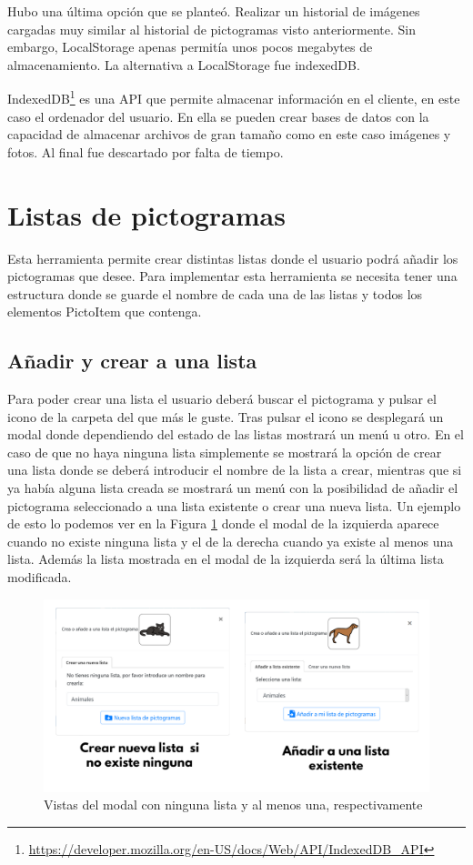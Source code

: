 Hubo una última opción que se planteó. Realizar un historial de imágenes cargadas muy similar al historial de pictogramas visto anteriormente. Sin embargo, LocalStorage apenas permitía unos pocos megabytes de almacenamiento. La alternativa a LocalStorage fue indexedDB. 

IndexedDB\footnote{\url{https://developer.mozilla.org/en-US/docs/Web/API/IndexedDB_API}}   es una API que permite almacenar información en el cliente, en este caso el ordenador del usuario. En ella se pueden crear bases de datos con la capacidad de almacenar archivos de gran tamaño como en este caso imágenes y fotos. Al final fue descartado por falta de tiempo.





\section{Listas de pictogramas}
\label{listapictos}

Esta herramienta permite crear distintas listas donde el usuario podrá añadir los pictogramas que desee.
Para implementar esta herramienta se necesita tener una estructura donde se guarde el nombre de cada una de las listas y todos los elementos PictoItem que contenga. 

\subsection{Añadir y crear a una lista}

Para poder crear una lista el usuario deberá buscar el pictograma y pulsar el icono de la carpeta del que más le guste. Tras pulsar el icono se desplegará un modal donde dependiendo del estado de las listas mostrará un menú u otro. En el caso de que no haya ninguna lista simplemente se mostrará la opción de crear una lista donde se deberá introducir el nombre de la lista a crear, mientras que si ya había alguna lista creada se mostrará un menú con la posibilidad de añadir el pictograma seleccionado a una lista existente o crear una nueva lista. Un ejemplo de esto lo podemos ver en la Figura \ref{fig:modalescoleccion} donde el modal de la izquierda aparece cuando no existe ninguna lista y el de la derecha cuando ya existe al menos una lista. Además la lista mostrada en el modal de la izquierda será la última lista modificada.

\begin{figure}[h!]
	\centering
	\includegraphics[width=0.7\linewidth]{Imagenes/Bitmap/modalesColeccion}
	\caption{Vistas del modal con ninguna lista y al menos una, respectivamente}
	\label{fig:modalescoleccion}
\end{figure}


